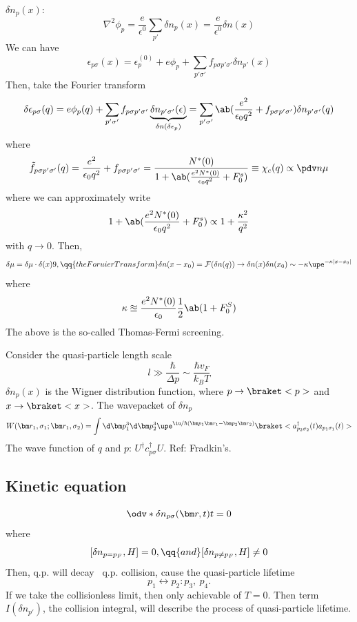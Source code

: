 $\delta n_p(x)$:
\begin{equation}
  \nabla^2 \phi_p = \frac e{\epsilon^0} \sum_{p'} \delta n_p (x)
= \frac{e}{\epsilon^0} \delta n(x)
\end{equation}
We can have
\begin{equation}
  \epsilon_{p\sigma}(x) = \epsilon_p^{(0)} + e\phi_p
+ \sum_{p'\sigma'} f_{p\sigma p'\sigma'} \delta n_{p'} (x)
\end{equation}
Then, take the Fourier transform
\begin{equation}
  \delta \epsilon_{p\sigma}(q) = e\phi_p(q)
+ \sum_{p'\sigma'} f_{p\sigma p'\sigma'}
  \underbrace{\delta n_{p'\sigma'}(\epsilon)}_{\delta n(\delta\epsilon_p)}
= \sum_{p'\sigma'} \ab(\frac{e^2}{\epsilon_0q^2}
+ f_{p\sigma p'\sigma'}) \delta n_{p'\sigma'}(q)
\end{equation}
where
\[
  \tilde f_{p\sigma p'\sigma'}(q) = \frac{e^2}{\epsilon_0q^2} + f_{p\sigma p'\sigma'}
= \frac{N^*(0)}{1 + \ab(\frac{e^2N^*(0)}{\epsilon_0q^2} + F_0^s)}
\equiv \chi_c(q) \propto \pdv n\mu
\]
where we can approximately write
\[
  1 + \ab(\frac{e^2N^*(0)}{\epsilon_0q^2} + F_0^s) \propto 1 + \frac{\kappa^2}{q^2}
\]
with $q \to 0$.
Then,
\[
  \delta \mu = \delta\mu \cdot\delta(x)9, \qq{the Foruier Transform}
  \delta n(x - x_0) = \mathcal F(\delta n(q)) \to \delta n(x) \delta n(x_0)
  \sim -\kappa \upe^{-\kappa|x - x_0|}
\]
where
\[
  \kappa \approxeq \frac{e^2 N^*(0)}{\epsilon_0} \frac12\ab(1 + F_0^S)
\]
The above is the so-called Thomas-Fermi screening.

Consider the quasi-particle length scale
\begin{equation}
  l \gg \frac{\hbar}{\Delta p} \sim \frac{\hbar v_F}{k_BT}
\end{equation}
$\delta n_p(x)$ is the Wigner distribution function,
where $p \to \braket<p>$ and $x \to \braket<x>$.
The wavepacket of $\delta n_p$
\begin{equation}
  W(\bm r_1, \sigma_1; \bm r_1, \sigma_2) =
  \int \d\bm p_1^3 \d\bm p_2^3
  \upe^{\iu/\hbar (\bm p_1\bm r_1 - \bm p_2\bm r_2)}
  \braket<a_{p_2\sigma_2}^\dagger(t) a_{p_1\sigma_1}(t)>
\end{equation}
The wave function of $q$ and $p$: $U^\dagger c_{p\sigma}^\dagger U$.
Ref: Fradkin's.

\subsection{Kinetic equation}

\begin{equation}
  \odv*{\delta n_{p\sigma}(\bm r, t)}t = 0
\end{equation}
where
\[
  [\delta n_{p = p_F}, H] = 0, \qq{and} [\delta n_{p \neq p_F}, H] \neq 0
\]
Then, q.p. will decay \textrightarrow\ q.p. collision, cause the quasi-particle lifetime
\[
  p_1 \leftrightarrow p_2: p_3,\ p_4.
\]
If we take the collisionless limit, then only achievable of $T = 0$.
Then term $I(\delta n_{p'})$, the collision integral, will describe the process
of quasi-particle lifetime.

